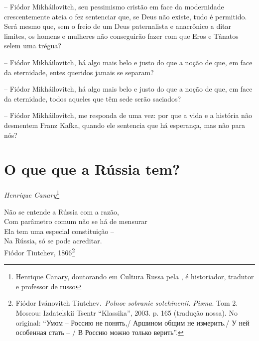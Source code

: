 -- Fiódor Mikháilovitch, seu pessimismo cristão em face da modernidade
crescentemente ateia o fez sentenciar que, se Deus não existe, tudo é
permitido. Será mesmo que, sem o freio de um Deus paternalista e
anacrônico a ditar limites, os homens e mulheres não conseguirão fazer
com que Eros e Tânatos selem uma trégua?

-- Fiódor Mikháilovitch, há algo mais belo e justo do que a noção de
que, em face da eternidade, entes queridos jamais se separam?

-- Fiódor Mikháilovitch, há algo mais belo e justo do que a noção de
que, em face da eternidade, todos aqueles que têm sede serão saciados?

-- Fiódor Mikháilovitch, me responda de uma vez: por que a vida e a
história não desmentem Franz Kafka, quando ele sentencia que há
esperança, mas não para nós?

\chapter*{O que que a Rússia tem?}

\begin{flushright}
\emph{Henrique Canary}\footnote{Henrique Canary, doutorando em Cultura Russa pela , é historiador, tradutor e professor de russo}
\end{flushright}

\begin{flushright}
Não se entende a Rússia com a razão,\\
Com parâmetro comum não se há de mensurar\\
Ela tem uma especial constituição --\\
Na Rússia, só se pode acreditar.\\[5pt]
Fiódor Tiutchev, 1866\footnote{Fiódor Ivánovitch Tiutchev.~\emph{Polnoe
  sobranie sotchinenii. Pisma}. Tom 2. Moscou: Izdatelskii Tsentr
  ``Klassika'', 2003. p. 165 (tradução nossa). No original: ``Умом --
  Россию не понять,/ Аршином общим не измерить./ У ней особенная стать
  -- / В Россию можно только верить''.}
\end{flushright}

